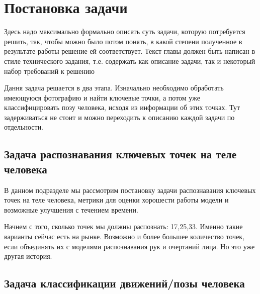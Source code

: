 \section{Постановка задачи}
\label{sec:Chapter1} 
Здесь надо максимально формально описать суть задачи, которую потребуется решить, так, чтобы можно было потом понять, в какой степени полученное в результате работы решение ей соответствует. Текст главы должен быть написан в стиле технического задания, т.е. содержать как описание задачи, так и некоторый набор требований к решению

Дання задача решается в два этапа. Изначально необходимо обработать имеющуюся фотографию и найти ключевые точки, а потом уже классифицировать позу человека, исходя из информации об этих точках. Тут задерживаться не стоит и можно переходить к описанию каждой задачи по отдельности.

\subsection{Задача распознавания ключевых точек на теле человека}

В данном подразделе мы рассмотрим постановку задачи распознавания ключевых точек на теле человека, метрики для оценки хорошести работы модели и возможные улучшения с течением времени.

Начнем с того, сколько точек мы должны распознать: 17,25,33. Именно такие варианты сейчас есть на рынке. Возможно и более большее количество точек, если объединять их с моделями распознавания рук и очертаний лица. Но это уже другая история.

\subsection{Задача классификации движений/позы человека}
\newpage